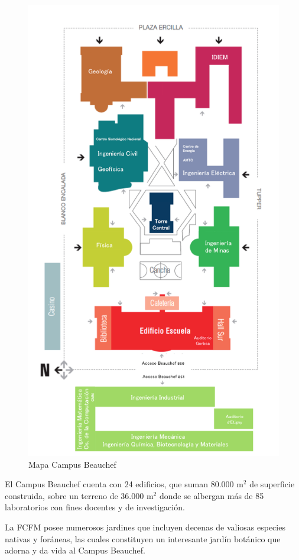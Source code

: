 \begin{figure}[ht!]
\centering
\includegraphics[width=0.94\columnwidth]{./pictures/mapa_fcfm.jpg}
\caption{Mapa Campus Beauchef}
\label{map_fcfm}
\end{figure}

El Campus Beauchef cuenta con 24 edificios, que suman 80.000 m$^2$ de superficie construida,
sobre un terreno de 36.000 m$^2$ donde se albergan más de 85 laboratorios con fines docentes y de
investigación.

La FCFM posee numerosos jardines que incluyen decenas de valiosas especies nativas y
foráneas, las cuales constituyen un interesante jardín botánico que adorna y da vida al Campus
Beauchef.

